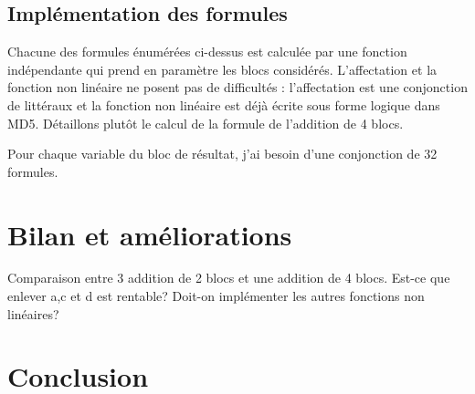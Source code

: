 \documentclass{article}
\begin{document}
\subsection{Implémentation des formules}
Chacune des formules énumérées ci-dessus est calculée par une fonction indépendante qui prend en paramètre les blocs considérés. L'affectation et la fonction non linéaire ne posent pas de difficultés : l'affectation est une conjonction de littéraux et la fonction non linéaire est déjà écrite sous forme logique dans MD5. Détaillons plutôt le calcul de la formule de l'addition de 4 blocs. 
\par
Pour chaque variable du bloc de résultat, j'ai besoin d'une conjonction de 32 formules.
\section{Bilan et améliorations}
Comparaison entre 3 addition de 2 blocs et une addition de 4 blocs. Est-ce que enlever a,c et d est rentable? Doit-on implémenter les autres fonctions non linéaires?

\section{Conclusion}
\end{document}
